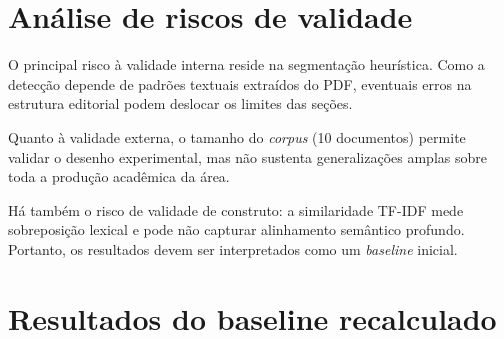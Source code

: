 \documentclass[12pt]{article}
\begin{document}
\section{Análise de riscos de validade}

O principal risco à validade interna reside na segmentação heurística. Como a detecção depende de padrões textuais extraídos do PDF, eventuais erros na estrutura editorial podem deslocar os limites das seções.

Quanto à validade externa, o tamanho do \textit{corpus} (10 documentos) permite validar o desenho experimental, mas não sustenta generalizações amplas sobre toda a produção acadêmica da área.

Há também o risco de validade de construto: a similaridade TF-IDF mede sobreposição lexical e pode não capturar alinhamento semântico profundo. Portanto, os resultados devem ser interpretados como um \textit{baseline} inicial.

\section{Resultados do baseline recalculado}
\end{document}

